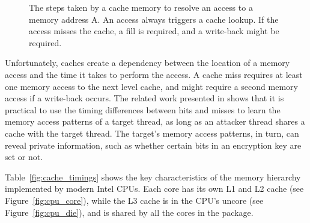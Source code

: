 \begin{figure}[hbt]
  \caption{
    The steps taken by a cache memory to resolve an access to a memory address
    A. An access always triggers a cache lookup. If the access misses the
    cache, a fill is required, and a write-back might be required.
  }
  \label{fig:cache_lookup}
\end{figure}

Unfortunately, caches create a dependency between the location of a memory
access and the time it takes to perform the access. A cache miss requires
at least one memory access to the next level cache, and might require a second
memory access if a write-back occurs. The related work presented in
\cite{banescu2011cache} shows that it is practical to use the timing
differences between hits and misses to learn the memory access patterns of a
target thread, as long as an attacker thread shares a cache with the target
thread. The target's memory access patterns, in turn, can reveal private
information, such as whether certain bits in an encryption key are set or not.

Table~\ref{fig:cache_timings} shows the key characteristics of the memory
hierarchy implemented by modern Intel CPUs. Each core has its own L1 and L2
cache (see Figure~\ref{fig:cpu_core}), while the L3 cache is in the CPU's
uncore (see Figure~\ref{fig:cpu_die}), and is shared by all the cores in the
package.

